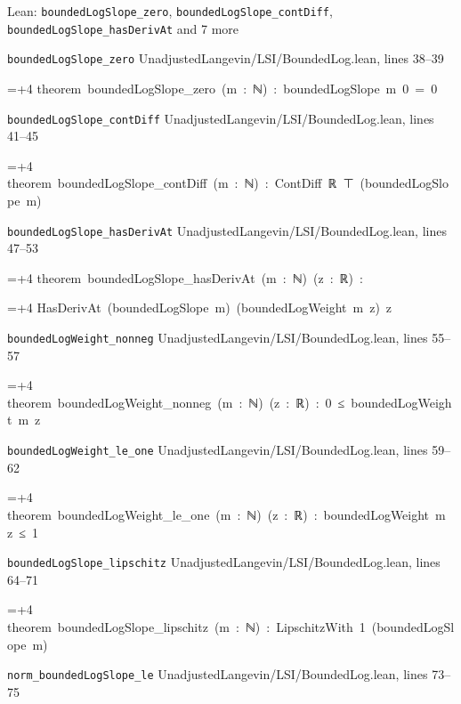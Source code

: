 \documentclass[11pt,a4paper]{report}
\newlength{\leancharwidth}
\newenvironment{leancode}{\par\smallskip\begingroup\ttfamily\footnotesize\raggedright
  \settowidth{\leancharwidth}{M}\setlength{\parskip}{0pt}\setlength{\parindent}{0pt}
  \frenchspacing}{\par\endgroup\smallskip}
\newcommand{\leanline}[2]{\hangindent=\dimexpr#1\leancharwidth+4\leancharwidth\relax
  \hangafter=1\noindent\hspace*{#1\leancharwidth}#2\par}
\newcommand{\leansource}[1]{\par{\footnotesize\color{leanmuted}#1}\par}
\begin{document}
\begin{leanbox}{Lean: \texttt{boundedLogSlope\_\allowbreak{}zero}, \texttt{boundedLogSlope\_\allowbreak{}contDiff}, \texttt{boundedLogSlope\_\allowbreak{}hasDerivAt} and 7 more}
\leansource{\texttt{boundedLogSlope\_\allowbreak{}zero} \quad UnadjustedLangevin/\allowbreak{}LSI/\allowbreak{}BoundedLog.lean, lines 38–39}
\begin{leancode}
\leanline{0}{theorem\ boundedLogSlope\_zero\ (m\ :\ ℕ)\ :\ boundedLogSlope\ m\ 0\ =\ 0}
\end{leancode}
\leansource{\texttt{boundedLogSlope\_\allowbreak{}contDiff} \quad UnadjustedLangevin/\allowbreak{}LSI/\allowbreak{}BoundedLog.lean, lines 41–45}
\begin{leancode}
\leanline{0}{theorem\ boundedLogSlope\_contDiff\ (m\ :\ ℕ)\ :\ ContDiff\ ℝ\ ⊤\ (boundedLogSlope\ m)}
\end{leancode}
\leansource{\texttt{boundedLogSlope\_\allowbreak{}hasDerivAt} \quad UnadjustedLangevin/\allowbreak{}LSI/\allowbreak{}BoundedLog.lean, lines 47–53}
\begin{leancode}
\leanline{0}{theorem\ boundedLogSlope\_hasDerivAt\ (m\ :\ ℕ)\ (z\ :\ ℝ)\ :}
\leanline{4}{HasDerivAt\ (boundedLogSlope\ m)\ (boundedLogWeight\ m\ z)\ z}
\end{leancode}
\leansource{\texttt{boundedLogWeight\_\allowbreak{}nonneg} \quad UnadjustedLangevin/\allowbreak{}LSI/\allowbreak{}BoundedLog.lean, lines 55–57}
\begin{leancode}
\leanline{0}{theorem\ boundedLogWeight\_nonneg\ (m\ :\ ℕ)\ (z\ :\ ℝ)\ :\ 0\ ≤\ boundedLogWeight\ m\ z}
\end{leancode}
\leansource{\texttt{boundedLogWeight\_\allowbreak{}le\_\allowbreak{}one} \quad UnadjustedLangevin/\allowbreak{}LSI/\allowbreak{}BoundedLog.lean, lines 59–62}
\begin{leancode}
\leanline{0}{theorem\ boundedLogWeight\_le\_one\ (m\ :\ ℕ)\ (z\ :\ ℝ)\ :\ boundedLogWeight\ m\ z\ ≤\ 1}
\end{leancode}
\leansource{\texttt{boundedLogSlope\_\allowbreak{}lipschitz} \quad UnadjustedLangevin/\allowbreak{}LSI/\allowbreak{}BoundedLog.lean, lines 64–71}
\begin{leancode}
\leanline{0}{theorem\ boundedLogSlope\_lipschitz\ (m\ :\ ℕ)\ :\ LipschitzWith\ 1\ (boundedLogSlope\ m)}
\end{leancode}
\leansource{\texttt{norm\_\allowbreak{}boundedLogSlope\_\allowbreak{}le} \quad UnadjustedLangevin/\allowbreak{}LSI/\allowbreak{}BoundedLog.lean, lines 73–75}
\begin{leancode}

\end{leancode}
\end{leanbox}
\end{document}

